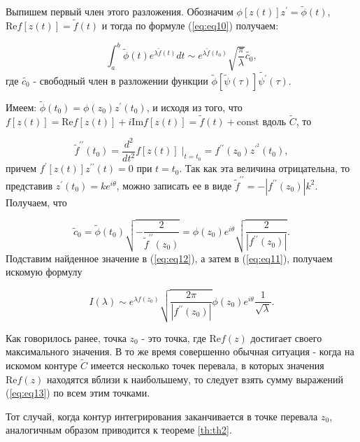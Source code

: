 \documentclass[14pt]{article}
\numberwithin{figure}{section}
\numberwithin{equation}{section}
\renewcommand{\Re}{\mathrm{Re}}
\renewcommand{\Im}{\mathrm{Im}}
\newcommand{\const}{\mathrm{const}}
\begin{document}
Выпишем первый член этого разложения. Обозначим $\phi[z(t)]z^\prime = \widetilde{\phi}(t)$, $\Re f[z(t)] = \widetilde{f}(t)$ и тогда по формуле (\ref{eq:eq10}) получаем:

\begin{equation}\label{eq:eq12}
\int_{a}^{b} \widetilde{\phi}(t) e^{\lambda \widetilde{f}(t)}dt \sim e^{\lambda \widetilde{f}(t_0)} \sqrt{\frac{\pi}{\lambda}} \widetilde{c_0},
\end{equation}
где $\widetilde{c_0}$ - свободный член в разложении функции $\widetilde{\phi}[\widetilde{\psi}(\tau)]\widetilde{\psi^\prime}(\tau)$.

Имеем: $\widetilde{\phi}(t_0) = \phi(z_0) z^\prime (t_0)$, и исходя из того, что $f[z(t)] = \Re f[z(t)]+ i \Im f[z(t)] = \widetilde{f}(t)+\const$ вдоль $\widetilde{C}$, то

\begin{equation}\nonumber
\widetilde{f}^{\prime\prime} (t_0) = \frac{d^2}{d t^2} f[z(t)]\;|_{t=t_0} = f^{\prime\prime} (z_0) z^{\prime^2} (t_0),
\end{equation}
причем $f^\prime[z(t)] z^{\prime \prime} (t) = 0$ при $t=t_0$. Так как эта величина отрицательна, то представив $z^\prime (t_0) = k e^{i \theta}$, можно записать ее в виде $\widetilde{f}^{\prime\prime}=-|f^{\prime\prime}(z_0)| k^2$. Получаем, что 

\begin{equation}\nonumber
\widetilde{c}_0=\widetilde{\phi}(t_0) \sqrt{-\frac{2}{\widetilde{f}^{\prime\prime}(z_0)}}= \phi (z_0) e^{i \theta} \sqrt{\frac{2}{|f^{\prime\prime}(z_0)|}}.
\end{equation}
Подставим найденное значение в (\ref{eq:eq12}), а затем в (\ref{eq:eq11}), получаем искомую формулу

\begin{equation}\label{eq:eq13}
I(\lambda) \sim e^{\lambda f (z_0)}\sqrt{\frac{2\pi}{|f^{\prime \prime} (z_0)|}} \phi(z_0) e^{i \theta} \frac{1}{\sqrt{\lambda}}.
\end{equation}

Как говорилось ранее, точка $z_0$ - это точка, где $\Re f(z)$ достигает своего максимального значения. В то же время совершенно обычная ситуация - когда на искомом контуре $\widetilde{C}$ имеется несколько точек перевала, в которых значения $\Re f (z)$ находятся вблизи к наибольшему, то следует взять сумму выражений (\ref{eq:eq13}) по всем этим точками. 

Тот случай, когда контур интегрирования заканчивается в точке перевала $z_0$, аналогичным образом приводится к теореме \ref{th:th2}.
\end{document}
